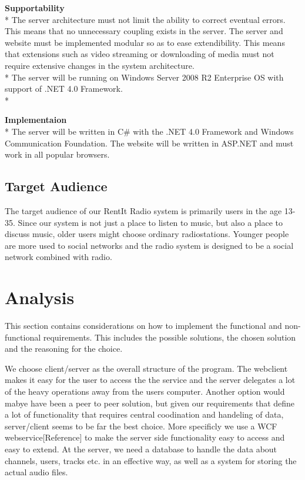 \documentclass[a4paper,11pt,report]{article}
\begin{document}
\textbf{Supportability} \\*
The server architecture must not limit the ability to correct eventual errors. This means that no unnecessary coupling exists in the server.
The server and website must be implemented modular so as to ease extendibility.
This means that extensions such as video streaming or downloading of media must not require extensive changes in the system architecture. \\*
The server will be running on Windows Server 2008 R2 Enterprise OS with support of .NET 4.0 Framework.\\*

\textbf{Implementaion} \\*
The server will be written in C\# with the .NET 4.0 Framework and Windows Communication Foundation.
The website will be written in ASP.NET and must work in all popular browsers.

\subsection{Target Audience}
The target audience of our RentIt Radio system is primarily users in the age 13-35. Since our system is not just a place to listen to music, but also a place to discuss music,  older users might choose ordinary radiostations. Younger people are more used to social networks and the radio system is designed to be a social network combined with radio.

\section{Analysis}
This section contains considerations on how to implement the functional and non-functional requirements. This includes the possible solutions, the chosen solution and the reasoning for the choice.

We choose client/server as the overall structure of the program. The webclient makes it easy for the user to access the the service and the server delegates a lot of the heavy operations away from the users computer. Another option would mabye have been a peer to peer solution, but given our requirements that define a lot of functionality that requires central coodination and handeling of data, server/client seems to be far the best choice. More specificly we use a WCF webservice[Reference] to make the server side functionality easy to access and easy to extend. At the server, we need a database to handle the data about channels, users, tracks etc. in an effective way, as well as a system for storing the actual audio files. 
\end{document}

